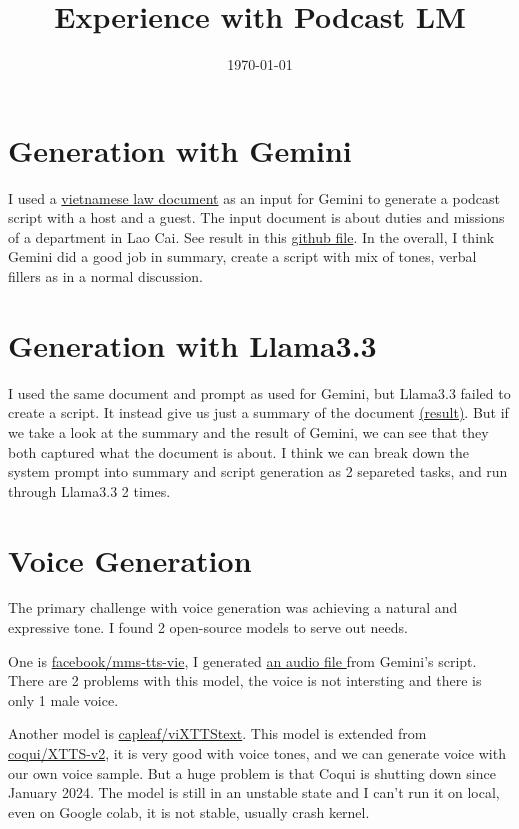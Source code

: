 \documentclass[12pt]{article}
\title{Experience with Podcast LM}
\author{}
\date{\today}
\begin{document}
\maketitle

\section{Generation with Gemini}

I used a \href{https://thuvienphapluat.vn/van-ban/Bo-may-hanh-chinh/Quyet-dinh-17-2021-QD-UBND-vi-tri-chuc-nang-Chi-cuc-Trong-trot-va-Bao-ve-thuc-vat-tinh-Lao-Cai-481420.aspx}{vietnamese law document} as an input for Gemini to generate a podcast script with a host and a guest.
The input document is about duties and missions of a department in Lao Cai. See result in this \href{https://github.com/Minhsuperfragile/llm_repurpose/blob/main/podcast_creation/gemini_vn_response.txt}{github file}. 
In the overall, I think Gemini did a good job in summary, create a script with mix of tones, verbal fillers as in a normal discussion. 

\section{Generation with Llama3.3}
I used the same document and prompt as used for Gemini, but Llama3.3 failed to create a script. It instead give us just a summary of the document \href{https://github.com/Minhsuperfragile/llm_repurpose/blob/main/podcast_creation/llama3.3_vn_response.txt}{(result)}.
But if we take a look at the summary and the result of Gemini, we can see that they both captured what the document is about. I think we can break down the system prompt into summary and script generation as 2 separeted tasks, and run through Llama3.3 2 times.
\section{Voice Generation}

The primary challenge with voice generation was achieving a natural and expressive tone. I found 2 open-source models to serve out needs.

One is \href{https://huggingface.co/facebook/mms-tts-vie}{facebook/mms-tts-vie}, I generated \href{https://github.com/Minhsuperfragile/llm_repurpose/blob/main/podcast_creation/output.wav}{an audio file } from Gemini's script. 
There are 2 problems with this model, the voice is not intersting and there is only 1 male voice. 

Another model is \href{https://huggingface.co/capleaf/viXTTS}{capleaf/viXTTStext}. This model is extended from \href{https://huggingface.co/coqui/XTTS-v2}{coqui/XTTS-v2}, it is very good with voice tones, and we can generate voice with our own voice sample. 
But a huge problem is that Coqui is shutting down since January 2024. The model is still in an unstable state and I can't run it on local, even on Google colab, it is not stable, usually crash kernel. 
\end{document}
